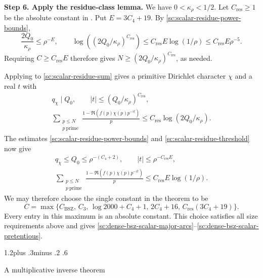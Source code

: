 \documentclass[twoside]{aomart}
\makeatletter
\theoremstyle{paperplain}
\theoremstyle{paperdefinition}
\renewcommand\section{\@startsection{section}{1}{\z@}
  {1.2\baselineskip plus .3\baselineskip minus .2\baselineskip}
  {.6\baselineskip}{\normalfont\large\bfseries\raggedright}}
\renewenvironment{proof}[1][\proofname]{\par\pushQED{\qed}%
  \normalfont\topsep6\p@\@plus3\p@\relax\trivlist
  \item[\hskip\labelsep\itshape #1\@addpunct{.}]\ignorespaces
}{\popQED\endtrivlist\@endpefalse}
\numberwithin{equation}{section}
\makeatother
\begin{document}
\begin{proof}
\par
\medskip
\noindent\textbf{Step 6. Apply the residue-class lemma.}
We have $0<\kappa_\rho<1/2$. Let $C_{\mathrm{res}}\ge1$ be the
absolute constant in .
Put $E=3C_4+19$. By \eqref{sc:scalar-residue-power-bounds},
\begin{equation}
 \frac{2Q_0}{\kappa_\rho}\le\rho^{-E},\qquad
 \log\left((2Q_0/\kappa_\rho)^{C_{\mathrm{res}}}\right)
 \le C_{\mathrm{res}}E\log(1/\rho)
 \le C_{\mathrm{res}}E\rho^{-5}.
 \label{sc:scalar-residue-threshold}
\end{equation}
Requiring $C\ge C_{\mathrm{res}}E$ therefore gives
$N\ge(2Q_0/\kappa_\rho)^{C_{\mathrm{res}}}$, as needed.

Applying  to \eqref{sc:scalar-residue-sum}
gives a primitive Dirichlet character $\chi$ and a real $t$ with
\begin{equation*}
 \begin{gathered}
 q_\chi\mid Q_0,\qquad
 |t|\le(Q_0/\kappa_\rho)^{C_{\mathrm{res}}},\\
 \sum_{\substack{p\le N\\p\ \mathrm{prime}}}\frac{1-\Re(f(p)\overline{\chi(p)}p^{-it})}{p}
 \le C_{\mathrm{res}}\log(2Q_0/\kappa_\rho).
 \end{gathered}
\end{equation*}
The estimates \eqref{sc:scalar-residue-power-bounds} and
\eqref{sc:scalar-residue-threshold} now give
\begin{equation*}
 \begin{gathered}
 q_\chi\le Q_0\le\rho^{-(C_4+2)},\qquad
 |t|\le\rho^{-C_{\mathrm{res}}E},\\
 \sum_{\substack{p\le N\\p\ \mathrm{prime}}}\frac{1-\Re(f(p)\overline{\chi(p)}p^{-it})}{p}
 \le C_{\mathrm{res}}E\log(1/\rho).
 \end{gathered}
\end{equation*}
We may therefore choose the single constant in the theorem to be
\begin{equation*}
 C=\max\{C_{\mathrm{BSZ}},\,C_3,\,\log2000+C_4+1,\,
            2C_4+16,\,C_{\mathrm{res}}(3C_4+19)\}.
\end{equation*}
Every entry in this maximum is an absolute constant.
This choice satisfies all size requirements above and gives
\eqref{sc:dense-bsz-scalar-major-arcs}--\eqref{sc:dense-bsz-scalar-pretentious}.
\end{proof}

\section{A multiplicative inverse theorem}
\label{inv:section}
\end{document}

